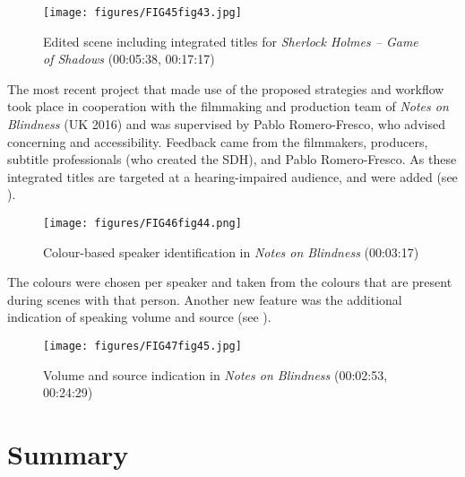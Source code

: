 \begin{figure}
\texttt{[image: figures/FIG45fig43.jpg]}
\caption{Edited scene including integrated titles for \textit{Sherlock Holmes – Game of Shadows} (00:05:38, 00:17:17)}
\label{fig:FIG45}
\end{figure}

\newpage 
The most recent project that made use of the proposed  strategies and workflow took place in cooperation with the filmmaking and production team of \textit{Notes on Blindness} (UK 2016) and was supervised by Pablo Romero-Fresco, who advised concerning  and accessibility. Feedback came from the filmmakers, producers, subtitle professionals (who created the SDH), and Pablo Romero-Fresco. As these integrated titles are targeted at a hearing-impaired audience,  and  were added (see ).

\begin{figure}
\texttt{[image: figures/FIG46fig44.png]}
\caption{Colour-based speaker identification in \textit{Notes on Blindness} (00:03:17)}
\label{fig:FIG46}
\end{figure}

The colours were chosen per speaker and taken from the colours that are present during scenes with that person. Another new feature was the additional indication of speaking volume and source (see ).

\begin{figure}
\texttt{[image: figures/FIG47fig45.jpg]}
\caption{Volume and source indication in \textit{Notes on Blindness} (00:02:53, 00:24:29)}
\label{fig:FIG47}
\end{figure}

\section{Summary}\label{sec:5.4}


